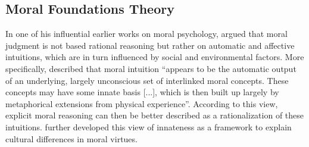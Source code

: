 \documentclass[12pt]{article}
\begin{document}





\subsection{Moral Foundations Theory}

In one of his influential earlier works on moral psychology, \citet{haidt2001emotional} argued that moral judgment is not based rational reasoning but rather on automatic and affective intuitions, which are in turn influenced by social and environmental factors. More specifically, \citet[825]{haidt2001emotional} described that moral intuition ``appears to be the automatic output of an underlying, largely unconscious set of interlinked moral concepts. These concepts may have some innate basis [...], which is then built up largely by metaphorical extensions from physical experience''. According to this view, explicit moral reasoning can then be better described as a rationalization of these intuitions. \citet{haidt2004intuitive} further developed this view of innateness as a framework to explain cultural differences in moral virtues.
\end{document}
